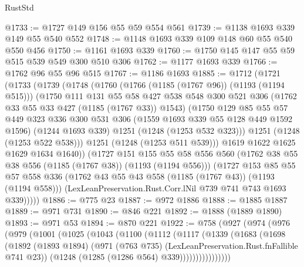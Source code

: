 \begin{lexlean}{RustStd}
\begin{coremodule}
@1733 := @1727 @149 @156 @55 @59 @554 @561
@1739 := @1138 @1693 @339 @149 @55 @540 @552
@1748 := @1148 @1693 @339 @109 @148 @60 @55 @540 @550 @456
@1750 := @1161 @1693 @339
@1760 := @1750 @145 @147 @55 @59 @515 @539 @549 @300 @510 @306
@1762 := @1177 @1693 @339
@1766 := @1762 @96 @55 @96 @515
@1767 := @1186 @1693
@1885 := @1712
    (@1721
      (@1733
        (@1739
          (@1748
            (@1760
              (@1766 (@1185 (@1767 @96)) (@1193 (@1194 @515)))
              (@1750
                @111
                @131
                @55
                @58
                @427
                @538
                @548
                @300
                @521
                @306
                (@1762 @33 @55 @33 @427 (@1185 (@1767 @33)) @1543)
                (@1750
                  @129
                  @85
                  @55
                  @57
                  @449
                  @323
                  @336
                  @300
                  @531
                  @306
                  (@1559 @1693 @339 @55 @128 @449 @1592 @1596)
                  (@1244 @1693 @339)
                  @1251
                  (@1248 (@1253 @532 @323)))
                @1251
                (@1248 (@1253 @522 @538)))
              @1251
              (@1248 (@1253 @511 @539)))
            @1619
            @1622
            @1625
            @1629
            @1634
            @1640))
        (@1727
          @151
          @155
          @55
          @58
          @556
          @560
          (@1762 @38 @55 @38 @556 (@1185 (@1767 @38)) (@1193 (@1194 @556)))
          (@1727
            @153
            @85
            @55
            @57
            @558
            @336
            (@1762 @43 @55 @43 @558 (@1185 (@1767 @43)) (@1193 (@1194 @558)))
            (LexLeanPreservation.Rust.Corr.lNil @739 @741 @743 @1693 @339)))))
@1886 := @775 @23
@1887 := @972 @1886
@1888 := @1885 @1887
@1889 := @971 @731
@1890 := @846 @221
@1892 := @1888 (@1889 @1890)
@1893 := @971 @53
@1894 := @870 @221
@1922 := @758
    (@927
      (@974
        (@976
          (@979
            (@1001
              (@1025
                (@1043
                  (@1100
                    (@1112
                      (@1117
                        (@1339
                          (@1683
                            (@1698
                              (@1892
                                (@1893 @1894)
                                (@971 (@763 @735) (LexLeanPreservation.Rust.fnFallible @741 @23))
                                (@1248 (@1285 (@1286 @564) @339))))))))))))))))

\end{coremodule}
\end{lexlean}
